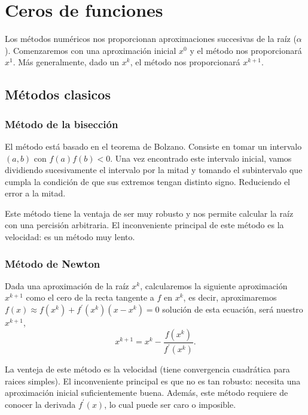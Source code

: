 \chapter{Ceros de funciones}

Los métodos numéricos nos proporcionan aproximaciones succesivas de la raíz ($\alpha$).
Comenzaremos con una aproximación inicial $x^0$  y el método nos proporcionará $x^1$. Más
generalmente, dado un $x^k$, el método nos proporcionará $x^{k+1}$.

\section{Métodos clasicos}

\subsection{Método de la bisección}

El método está basado en el teorema de Bolzano. Consiste en tomar un intervalo $(a, b)$
con $f(a)f(b) < 0$. Una vez encontrado este intervalo inicial, vamos dividiendo sucesivamente
el intervalo por la mitad y tomando el subintervalo que cumpla la condición de que sus extremos tengan
distinto signo. Reduciendo el error a la mitad.

Este método tiene la ventaja de ser muy robusto y nos permite calcular la raíz con una percisión arbitraria.
El inconveniente principal de este método es la velocidad: es un método muy lento.

\subsection{Método de Newton}

Dada una aproximación de la raíz $x^k$, calcularemos la siguiente aproximación $x^{k+1}$ como el cero de 
la recta tangente a $f$ en $x^k$, es decir, aproximaremos $f(x) \approx
f\left( x^k \right) + f^\prime\left( x^k \right) \left( x - x^k \right) = 0$  solución de esta ecuación,
será nuestro $x^{k+1}$,
\[
    x^{k+1} = x^k - \frac{f\left( x^k \right)}{f^\prime\left( x^k \right)}.
\]

La venteja de este método es la velocidad (tiene convergencia cuadrática para raices simples).
El inconveniente principal es que no es tan robusto: necesita una aproximación inicial suficientemente buena.
Además, este método requiere de conocer la derivada $f^\prime(x)$, lo cual puede ser caro o imposible.


